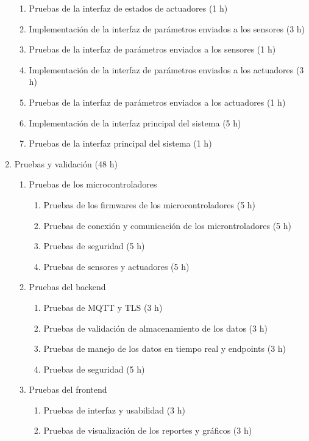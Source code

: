 \begin{enumerate}
\begin{enumerate}
		      \item Pruebas de la interfaz de estados de actuadores (1 h)
		      \item Implementación de la interfaz de  parámetros enviados a los sensores (3 h)
		      \item Pruebas de la interfaz de parámetros enviados a los sensores (1 h)
		      \item Implementación de la interfaz de parámetros enviados a los actuadores (3 h)
		      \item Pruebas de la interfaz de parámetros enviados a los actuadores (1 h)
		      \item Implementación de la interfaz principal del sistema (5 h)
		      \item Pruebas de la interfaz principal del sistema (1 h)
	      \end{enumerate}
	\item Pruebas y validación (48 h)
	      \begin{enumerate}
		      \item Pruebas de los microcontroladores
		            \begin{enumerate}
			            \item Pruebas de los firmwares de los microcontroladores (5 h)
			            \item Pruebas de conexión y comunicación de los microntroladores (5 h)
			            \item Pruebas de seguridad (5 h)
			            \item Pruebas de sensores y actuadores (5 h)
		            \end{enumerate}
		      \item Pruebas del backend
		            \begin{enumerate}
			            \item Pruebas de MQTT y TLS (3 h)
			            \item Pruebas de validación de almacenamiento de los datos (3 h)
			            \item Pruebas de manejo de los datos en tiempo real y endpoints (3 h)
			            \item Pruebas de seguridad (5 h)
		            \end{enumerate}
		      \item Pruebas del frontend
		            \begin{enumerate}
			            \item Pruebas de interfaz y usabilidad (3 h)
			            \item Pruebas de visualización de los reportes y gráficos (3 h)

\end{enumerate}
\end{enumerate}
\end{enumerate}
